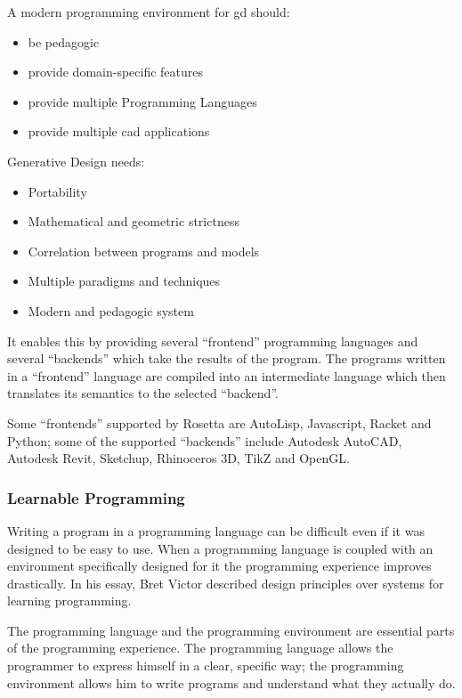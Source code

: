 \documentclass{./llncs2e/llncs}
\begin{document}
	A modern programming environment for \ac{gd} should:
	\begin{itemize}
		\item be pedagogic
		\item provide domain-specific features
		\item provide multiple Programming Languages
		\item provide multiple \ac{cad} applications
	\end{itemize}
	
	Generative Design needs:
	\begin{itemize}
		\item Portability
		\item Mathematical and geometric strictness
		\item Correlation between programs and models
		\item Multiple paradigms and techniques
		\item Modern and pedagogic system
	\end{itemize}
	
	It enables this by providing several ``frontend'' programming languages and several ``backends'' which take the results of the program. 
	The programs written in a ``frontend'' language are compiled into an intermediate language which then translates its semantics to the selected ``backend''.
	
	Some ``frontends'' supported by Rosetta are AutoLisp, Javascript, Racket and Python; some of the supported ``backends'' include Autodesk AutoCAD, Autodesk Revit, Sketchup, Rhinoceros 3D, TikZ and OpenGL.
	

\subsubsection{Learnable Programming\cite{victor2012learnable}}
	Writing a program in a programming language can be difficult even if it was designed to be easy to use. 
	When a programming language is coupled with an environment specifically designed for it the programming experience improves drastically. 
	In his essay\cite{victor2012learnable}, Bret Victor described design principles over systems for learning programming.
	
	The programming language and the programming environment are essential parts of the programming experience.
	The programming language allows the programmer to express himself in a clear, specific way; the programming environment allows him to write programs and understand what they actually do.
	
\end{document}
